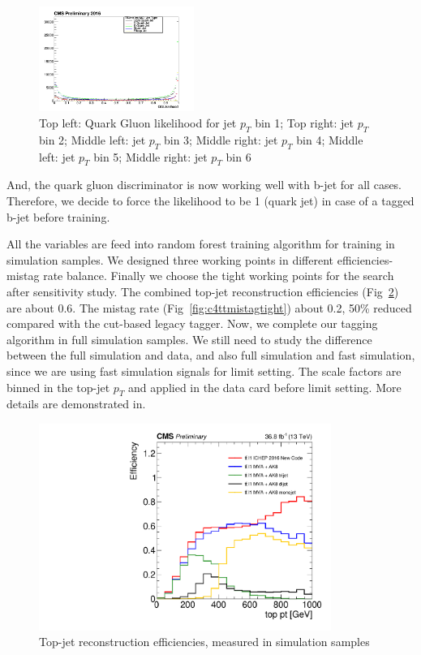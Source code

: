 \begin{figure}[htbp]
\begin{center}
  \includegraphics[width=0.45\textwidth]{sections/mc4/TopTagger/figures/_b_qglikelihoodjetptbin5_.png}
 \end{center}
 \caption{Top left: Quark Gluon likelihood for jet $p_{T}$ bin 1; Top right: jet $p_{T}$ bin 2; Middle left: jet $p_{T}$ bin 3; Middle right: jet $p_{T}$ bin 4; Middle left: jet $p_{T}$ bin 5; Middle right: jet $p_{T}$ bin 6}
 \label{fig:c4ttqgljetpt}
\end{figure}

And, the quark gluon discriminator is now working well with b-jet for all cases. Therefore, we decide to force the likelihood to be 1 (quark jet) in case of a tagged b-jet before training. 

All the variables are feed into random forest\cite{Ho:1995:RDF:844379.844681} training algorithm for training in simulation samples. We designed three working points in different efficiencies-mistag rate balance. Finally we choose the tight working points for the search after sensitivity study. The combined top-jet reconstruction efficiencies (Fig~\ref{fig:c4ttefftight}) are about 0.6. The mistag rate (Fig~\ref{fig:c4ttmistagtight}) about 0.2, 50\% reduced compared with the cut-based legacy tagger. Now, we complete our tagging algorithm in full simulation samples. We still need to study the difference between the full simulation and data, and also full simulation and fast simulation, since we are using fast simulation signals for limit setting. The scale factors are binned in the top-jet $p_{T}$ and applied in the data card before limit setting. More details are demonstrated in\cite{AN-16-461}. 

\begin{figure}[htbp]
 \begin{center}
  \includegraphics[width=0.85\textwidth]{sections/mc4/TopTagger/figures/baseline_eff_pt_ttbar1l_tight.pdf}
 \end{center}
 \caption{Top-jet reconstruction efficiencies, measured in \ttbar simulation samples}
 \label{fig:c4ttefftight}
\end{figure}

